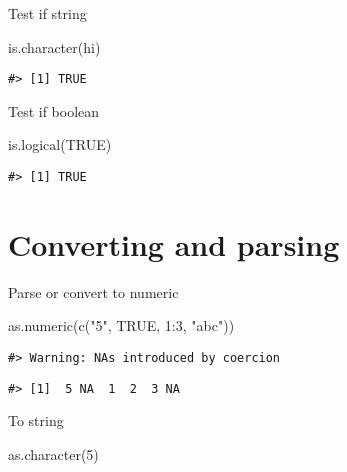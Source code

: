 \documentclass[
]{book}
\newenvironment{Shaded}{\begin{snugshade}}{\end{snugshade}}
\newcommand{\ConstantTok}[1]{\textcolor[rgb]{0.00,0.00,0.00}{#1}}
\newcommand{\DecValTok}[1]{\textcolor[rgb]{0.00,0.00,0.81}{#1}}
\newcommand{\FunctionTok}[1]{\textcolor[rgb]{0.00,0.00,0.00}{#1}}
\newcommand{\NormalTok}[1]{#1}
\newcommand{\SpecialCharTok}[1]{\textcolor[rgb]{0.00,0.00,0.00}{#1}}
\newcommand{\StringTok}[1]{\textcolor[rgb]{0.31,0.60,0.02}{#1}}
\begin{document}
Test if string

\begin{Shaded}
\begin{Highlighting}[]
\FunctionTok{is.character}\NormalTok{(}\StringTok{\textquotesingle{}hi\textquotesingle{}}\NormalTok{)}
\end{Highlighting}
\end{Shaded}

\begin{verbatim}
#> [1] TRUE
\end{verbatim}

Test if boolean

\begin{Shaded}
\begin{Highlighting}[]
\FunctionTok{is.logical}\NormalTok{(}\ConstantTok{TRUE}\NormalTok{)}
\end{Highlighting}
\end{Shaded}

\begin{verbatim}
#> [1] TRUE
\end{verbatim}

\hypertarget{converting-and-parsing}{%
\section{Converting and parsing}\label{converting-and-parsing}}

Parse or convert to numeric

\begin{Shaded}
\begin{Highlighting}[]
\FunctionTok{as.numeric}\NormalTok{(}\FunctionTok{c}\NormalTok{(}\StringTok{"5"}\NormalTok{, }\ConstantTok{TRUE}\NormalTok{, }\DecValTok{1}\SpecialCharTok{:}\DecValTok{3}\NormalTok{, }\StringTok{"abc"}\NormalTok{))}
\end{Highlighting}
\end{Shaded}

\begin{verbatim}
#> Warning: NAs introduced by coercion
\end{verbatim}

\begin{verbatim}
#> [1]  5 NA  1  2  3 NA
\end{verbatim}

To string

\begin{Shaded}
\begin{Highlighting}[]
\FunctionTok{as.character}\NormalTok{(}\DecValTok{5}\NormalTok{)}
\end{Highlighting}
\end{Shaded}
\end{document}

